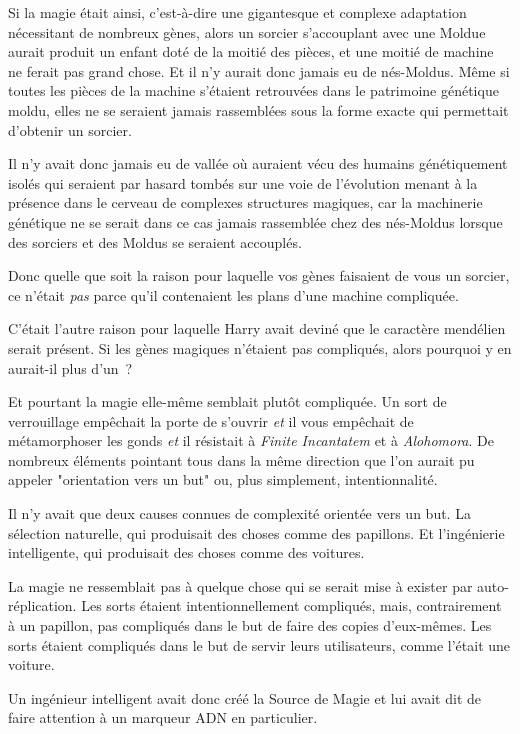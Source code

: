 Si la magie était ainsi, c'est-à-dire une gigantesque et complexe adaptation nécessitant de nombreux gènes, alors un sorcier s'accouplant avec une Moldue aurait produit un enfant doté de la moitié des pièces, et une moitié de machine ne ferait pas grand chose. Et il n'y aurait donc jamais eu de nés-Moldus. Même si toutes les pièces de la machine s'étaient retrouvées dans le patrimoine génétique moldu, elles ne se seraient jamais rassemblées sous la forme exacte qui permettait d'obtenir un sorcier.

Il n'y avait donc jamais eu de vallée où auraient vécu des humains génétiquement isolés qui seraient par hasard tombés sur une voie de l'évolution menant à la présence dans le cerveau de complexes structures magiques, car la machinerie génétique ne se serait dans ce cas jamais rassemblée chez des nés-Moldus lorsque des sorciers et des Moldus se seraient accouplés.

Donc quelle que soit la raison pour laquelle vos gènes faisaient de vous un sorcier, ce n'était \emph{pas} parce qu'il contenaient les plans d'une machine compliquée.

C'était l'autre raison pour laquelle Harry avait deviné que le caractère mendélien serait présent. Si les gènes magiques n'étaient pas compliqués, alors pourquoi y en aurait-il plus d'un~?

Et pourtant la magie elle-même semblait plutôt compliquée. Un sort de verrouillage empêchait la porte de s'ouvrir \emph{et} il vous empêchait de métamorphoser les gonds \emph{et} il résistait à \emph{Finite Incantatem} et à \emph{Alohomora}. De nombreux éléments pointant tous dans la même direction que l'on aurait pu appeler "orientation vers un but" ou, plus simplement, intentionnalité.

Il n'y avait que deux causes connues de complexité orientée vers un but. La sélection naturelle, qui produisait des choses comme des papillons. Et l'ingénierie intelligente, qui produisait des choses comme des voitures.

La magie ne ressemblait pas à quelque chose qui se serait mise à exister par auto-réplication. Les sorts étaient intentionnellement compliqués, mais, contrairement à un papillon, pas compliqués dans le but de faire des copies d'eux-mêmes. Les sorts étaient compliqués dans le but de servir leurs utilisateurs, comme l'était une voiture.

Un ingénieur intelligent avait donc créé la Source de Magie et lui avait dit de faire attention à un marqueur ADN en particulier.

